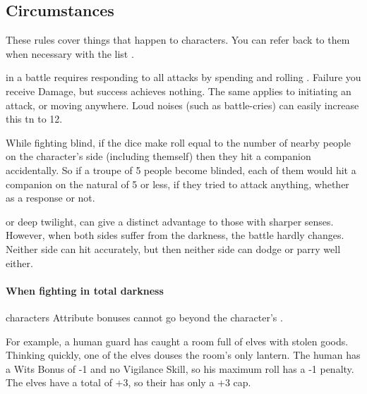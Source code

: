 \begin{multicols}{2}

\subsection{Circumstances}

These rules cover things that happen to characters.
You can refer back to them when necessary with the list .

in a battle requires responding to all attacks by spending  and rolling .
Failure you receive Damage, but success achieves nothing.
The same applies to initiating an attack, or moving anywhere.
Loud noises (such as battle-cries) can easily increase this \gls{tn} to 12.

While fighting blind, if the dice make  roll equal to the number of nearby people on the character's side (including themself) then they hit a companion accidentally.
So if a troupe of 5 people become blinded, each of them would hit a companion on the \gls{natural} of 5 or less, if they tried to attack anything, whether as a response or not.

\label{darkness}
or deep twilight, can give a distinct advantage to those with sharper senses.
However, when both sides suffer from the darkness, the battle hardly changes.
Neither side can hit accurately, but then neither side can dodge or parry well either.

\paragraph*{When fighting in total darkness}
characters Attribute bonuses cannot go beyond the character's .

\begin{exampletext}
  For example, a human guard has caught a room full of elves with stolen goods.
  Thinking quickly, one of the elves douses the room's only lantern.
  The human has a Wits Bonus of -1 and no Vigilance Skill, so his maximum roll has a -1 penalty.
  The elves have a total  of +3, so their  has only a +3 cap.
\end{exampletext}


\end{multicols}
